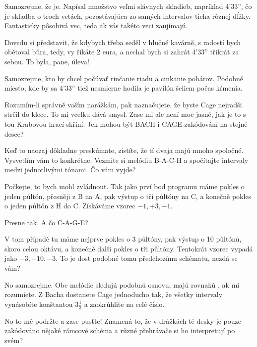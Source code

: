 \documentclass[12pt]{article}
\begin{document}
\begin{description}[itemsep=0pt]
\item[Ž:] Samozrejme, že je. Napísal množstvo veľmi slávnych skladieb, napríklad 4'33'', 
    čo je skladba o troch vetách, pozostávajúca zo samých intervalov ticha rôznej dĺžky. 
    Fantasticky pôsobivá vec, teda ak vás takéto veci zaujímajú.

\item[A:] Dovedu si představit, že kdybych třeba seděl v hlučné kavárně, s radostí
    bych obětoval bůra, tedy, vy říkáte 2 eura, a nechal bych si zahrát 4'33'' třikrát za sebou. To byla, pane, úleva!

\item[Ž:] Samozrejme, kto by chcel počúvať rinčanie riadu a cinkanie pohárov. Podobné 
    miesto, kde by sa 4'33'' tiež nesmierne hodila je pavilón šeliem počas kŕmenia.

\item[A:] Rozumím-li správně vaším narážkám, pak naznačujete, že byste Cage nejradši
    strčil do klece. To mi vcelku dává smysl. Zase mi ale není moc jasné, jak je
    to s tou Krabovou hrací skříní. Jek mohou být BACH i CAGE zakódování na stejné
    desce?

\item[Ž:] Keď to naozaj dôkladne preskúmate, zistíte, že tí dvaja majú mnoho spoločné. 
    Vysvetlím vám to konkrétne. Vezmite si melódiu B-A-C-H a spočítajte intervaly medzi 
    jednotlivými tónami. Čo vám vyjde?

\item[A:] Počkejte, to bych mohl zvládnout. Tak jako prví bod programu
    máme pokles o jeden půltón, přesněji z B na A, pak výstup o tři půltóny
    na C, a konečně pokles o jeden půltón z H do C. Získáváme vzorec $-1, +3, -1$.

\item[Ž:] Presne tak. A čo C-A-G-E?

\item[A:] V tom případě tu máme nejprve pokles o 3 půltóny, pak výstup o
    10 půltónů, skoro celou oktávu, a konečně další pokles o tři půltóny.
    Tentokrát vzorec vypadá jako $-3, +10, -3$. To je dost podobné
    tomu předchozímu schématu, nezdá se vám?

\item[Ž:] No samozrejme. Obe melódie sledujú podobnú osnovu, majú rovnakú 
    , ak mi rozumiete. Z Bacha dostanete Cage jednoducho tak, 
    že všetky intervaly vynásobíte konštantou $3\frac{1}{3}$ a zaokrúhlite 
    na celé číslo.

\item[A:] No to mě podržte a zase pusťte! Znamená to, že v drážkách té desky
    je pouze zakódováno nějaké rámcové schéma a různé přehrávače si ho interpretují
    po svém?


\end{description}
\end{document}

